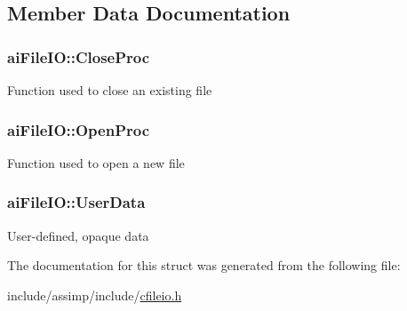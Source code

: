 \subsection{Member Data Documentation}
\hypertarget{structai_file_i_o_a7ec702672712b5a02dc49cb17f980a14}{
\subsubsection[{Close\-Proc}]{ ai\-File\-I\-O\-::\-Close\-Proc}}\label{structai_file_i_o_a7ec702672712b5a02dc49cb17f980a14}
Function used to close an existing file \hypertarget{structai_file_i_o_a819d9c7823039294125068d06949a6df}{
\subsubsection[{Open\-Proc}]{ ai\-File\-I\-O\-::\-Open\-Proc}}\label{structai_file_i_o_a819d9c7823039294125068d06949a6df}
Function used to open a new file \hypertarget{structai_file_i_o_a9c62b7f3d70fbb2f41e33ad0b9933139}{
\subsubsection[{User\-Data}]{ ai\-File\-I\-O\-::\-User\-Data}}\label{structai_file_i_o_a9c62b7f3d70fbb2f41e33ad0b9933139}
User-\/defined, opaque data 

The documentation for this struct was generated from the following file\-:\begin{DoxyCompactItemize}
\item 
include/assimp/include/\hyperlink{cfileio_8h}{cfileio.\-h}\end{DoxyCompactItemize}
